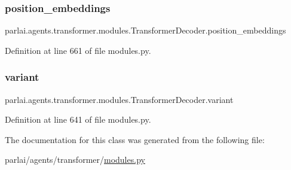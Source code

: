 \subsubsection{\texorpdfstring{position\+\_\+embeddings}{position\_embeddings}}
{\footnotesize\ttfamily parlai.\+agents.\+transformer.\+modules.\+Transformer\+Decoder.\+position\+\_\+embeddings}



Definition at line 661 of file modules.\+py.

\mbox{\label{classparlai_1_1agents_1_1transformer_1_1modules_1_1TransformerDecoder_a84349da2592ce07a34257a3995dd2254}} 
\subsubsection{\texorpdfstring{variant}{variant}}
{\footnotesize\ttfamily parlai.\+agents.\+transformer.\+modules.\+Transformer\+Decoder.\+variant}



Definition at line 641 of file modules.\+py.



The documentation for this class was generated from the following file\+:\begin{DoxyCompactItemize}
\item 
parlai/agents/transformer/\hyperlink{parlai_2agents_2transformer_2modules_8py}{modules.\+py}\end{DoxyCompactItemize}
